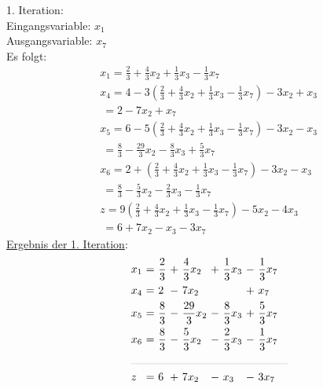 \documentclass [a4paper,11pt]{article}
\begin{document}
\begin{enumerate}
\begin{enumerate}
                1. Iteration:\\
                Eingangsvariable: $x_1$\\
                Ausgangsvariable: $x_7$\\
                Es folgt:
                \begin{align*}
                & x_1 = \frac{2}{3} + \frac{4}{3}x_2 + \frac{1}{3}x_3 - \frac{1}{3}x_7\\
                & x_4 = 4 - 3\left( \frac{2}{3} + \frac{4}{3}x_2 + \frac{1}{3}x_3 - \frac{1}{3}x_7 \right) - 3x_2 + x_3\\
                &   \ = 2 - 7x_2 + x_7\\
                & x_5 = 6 - 5\left( \frac{2}{3} + \frac{4}{3}x_2 + \frac{1}{3}x_3 - \frac{1}{3}x_7 \right) - 3x_2 - x_3\\
                &   \ = \frac{8}{3} - \frac{29}{3}x_2 - \frac{8}{3}x_3 + \frac{5}{3}x_7\\
                & x_6 = 2 + \left( \frac{2}{3} + \frac{4}{3}x_2 + \frac{1}{3}x_3 - \frac{1}{3}x_7 \right) - 3x_2 - x_3\\
                &   \ = \frac{8}{3} - \frac{5}{3}x_2 - \frac{2}{3}x_3 - \frac{1}{3}x_7\\
                &   z = 9 \left( \frac{2}{3} + \frac{4}{3}x_2 + \frac{1}{3}x_3 - \frac{1}{3}x_7 \right) - 5x_2 - 4x_3\\
                &   \ = 6 + 7x_2 - x_3 - 3x_7
                \end{align*}
                \underline{Ergebnis der 1. Iteration}:
                \begin{align*}
                \begin{alignedat}{6}
                & x_1 &\ = &\ \frac{2}{3}  &\ + &\  \frac{4}{3}x_2 &\ + &\ \frac{1}{3}x_3 &\ - &\ \frac{1}{3}x_7 \\
                & x_4 &\ = &\ 2            &\ - &\            7x_2 &    &                 &\ + &\ x_7 \\
                & x_5 &\ = &\ \frac{8}{3}  &\ - &\ \frac{29}{3}x_2 &\ - &\ \frac{8}{3}x_3 &\ + &\ \frac{5}{3}x_7 \\
                & x_6 &\ = &\ \frac{8}{3}  &\ - &\  \frac{5}{3}x_2 &\ - &\ \frac{2}{3}x_3 &\ - &\ \frac{1}{3}x_7 \\
                &\rlap{\rule{5cm}{.1pt}} &&&&&&&&\\
                & z   &\ = &\ 6            &\ + &\            7x_2 &\ - &\            x_3 &\ - &\ 3x_7
                \end{alignedat}
                \end{align*}


\end{enumerate}
\end{enumerate}
\end{document}

